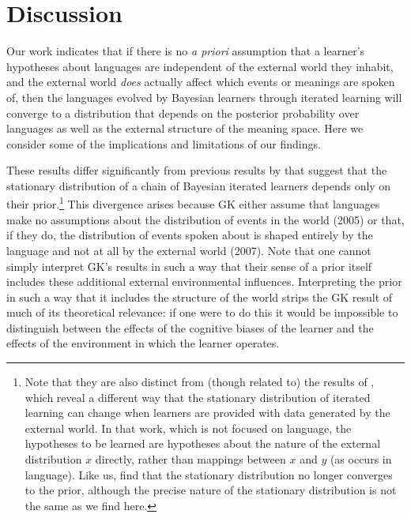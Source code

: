 \documentclass{apa}
\begin{document}
\section{Discussion}

Our work indicates that if there is no {\em a priori} assumption that a learner's hypotheses about languages are independent of the external world they inhabit, and the external world {\it does} actually affect which events or meanings are spoken of, then the languages evolved by Bayesian learners through iterated learning will converge to a distribution that depends on the posterior probability over languages as well as the external structure of the meaning space. Here we consider some of the implications and limitations of our findings.

These results differ significantly from previous results by  that suggest that the stationary distribution of a chain of Bayesian iterated learners depends only on their prior.\footnote{Note that they are also distinct from (though related to) the results of , which reveal a different way that the stationary distribution of iterated learning can change when learners are provided with data generated by the external world. In that work, which is not focused on language, the hypotheses to be learned are hypotheses about the nature of the external distribution $x$ directly, rather than mappings between $x$ and $y$ (as occurs in language). Like us,  find that the stationary distribution no longer converges to the prior, although the precise nature of the stationary distribution is not the same as we find here.}  This divergence arises because GK either assume that languages make no assumptions about the distribution of events in the world (2005) or that, if they do, the distribution of events spoken about is shaped entirely by the language and not at all by the external world (2007). Note that one cannot simply interpret GK's results in such a way that their sense of a prior itself includes these additional external environmental influences.
Interpreting the prior in such a way that it includes the structure of the world strips the GK result of much of its theoretical relevance: if one were to do this it would be impossible to distinguish between the effects of the cognitive biases of the learner and the effects of the environment in which the learner operates.
\end{document}
